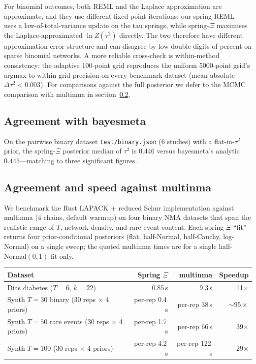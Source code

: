 \documentclass[12pt]{article}
\begin{document}
For binomial outcomes, both REML and the Laplace approximation are
approximate, and they use different fixed-point iterations:
our spring-REML~\citep{papakonstantinou2025spring} uses a
law-of-total-variance update on the tau springs, while spring-$\Xi$
maximises the Laplace-approximated $\ln Z(\tau^2)$ directly. The two
therefore have different approximation error structure and can
disagree by low double digits of percent on sparse binomial
networks. A more reliable cross-check is within-method
consistency: the adaptive 100-point grid reproduces the uniform
5000-point grid's argmax to within grid precision on every
benchmark dataset (mean absolute $\Delta \tau^2 < 0.003$). For
comparisons against the full posterior we defer to the MCMC
comparison with multinma in section~\ref{sec:multinma-compare}.

\subsection{Agreement with bayesmeta}

On the pairwise binary dataset \texttt{test/binary.json} (6
studies) with a flat-in-$\tau^2$ prior, the spring-$\Xi$ posterior
median of $\tau^2$ is $0.446$ versus bayesmeta's analytic
$0.445$---matching to three significant figures.

\subsection{Agreement and speed against multinma}\label{sec:multinma-compare}

We benchmark the Rust LAPACK + reduced Schur implementation
against multinma (4 chains, default warmup) on four binary NMA
datasets that span the realistic range of $T$, network density,
and rare-event content. Each spring-$\Xi$ ``fit'' returns four
prior-conditional posteriors (flat, half-Normal, half-Cauchy,
log-Normal) on a single sweep; the quoted multinma times are for a
single half-Normal$(0,1)$ fit only.

\begin{center}
\begin{tabular}{lrrr}
\toprule
Dataset & Spring $\Xi$ & multinma & Speedup \\
\midrule
Dias diabetes ($T{=}6$, $k{=}22$) & 0.85\,s & 9.3\,s & 11$\times$ \\
Synth $T{=}30$ binary (30 reps $\times$ 4 priors) & per-rep 0.4\,s & per-rep 38\,s & $\sim 95\times$ \\
Synth $T{=}50$ rare events (30 reps $\times$ 4 priors) & per-rep 1.7\,s & per-rep 66\,s & 39$\times$ \\
Synth $T{=}100$ (30 reps $\times$ 4 priors) & per-rep 4.2\,s & per-rep 122\,s & 29$\times$ \\
\bottomrule
\end{tabular}
\end{center}
\end{document}
